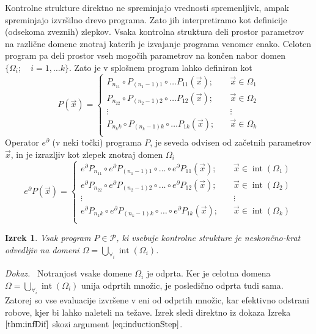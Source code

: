 \documentclass[a4paper, 12pt]{book}
\newcommand{\dP}{\mathcal{P}}
\newcommand{\D}{\partial}
\DeclareMathOperator{\interior}{int}
\newtheorem{izrek}{Izrek}[chapter]
\newenvironment{dokaz}{\emph{Dokaz.}\ }{\hspace{\fill}{$\Box$}}
\begin{document}
Kontrolne strukture direktno ne spreminjajo vrednosti spremenljivk, ampak spreminjajo izvršilno drevo programa. Zato jih interpretiramo kot definicije (odsekoma zveznih) zlepkov. Vsaka kontrolna struktura deli prostor parametrov na različne domene znotraj katerih je izvajanje programa venomer enako. Celoten program pa deli prostor vseh mogočih parametrov na končen nabor domen $\{\Omega_i;\quad i=1,\ldots
  k\}$. Zato je v splošnem program lahko definiran kot
\begin{equation}
   \label{eq:zlrprk_splosno}
   P(\vec{x}) =
   \begin{cases}
     P_{n_11}\circ P_{(n_1-1)1}\circ\ldots P_{11}(\vec{x});&\quad \vec{x}\in\Omega_1\\
     P_{n_22}\circ P_{(n_2-1)2}\circ\ldots P_{12}(\vec{x});&\quad \vec{x}\in\Omega_2\\
     \vdots&\quad\vdots\\
     P_{n_kk}\circ P_{(n_k-1)k}\circ\ldots P_{1k}(\vec{x});&\quad \vec{x}\in\Omega_k\\
   \end{cases}
 \end{equation}
 Operator $e^\D$ (v neki točki) programa $P$, je seveda odvisen od začetnih parametrov $\vec{x}$, in je izrazljiv kot zlepek znotraj domen $\Omega_i$
 \begin{equation}
   \label{eq:Dzlrprk_splosno}
   e^\D P({\vec{x}}) =
   \begin{cases}
     e^\D P_{n_11}\circ e^\D P_{(n_1-1)1}\circ\ldots\circ e^\D P_{11}(\vec{x});&\quad \vec{x}\in\interior(\Omega_1)\\
     e^\D P_{n_22}\circ e^\D P_{(n_2-1)2}\circ\ldots\circ e^\D P_{12}(\vec{x});&\quad \vec{x}\in\interior(\Omega_2)\\
     \vdots&\quad\vdots\\
     e^\D P_{n_kk}\circ e^\D P_{(n_k-1)k}\circ\ldots\circ e^\D P_{1k}(\vec{x});&\quad \vec{x}\in\interior(\Omega_k)\\
   \end{cases}
 \end{equation}

 \begin{izrek}\label{izr:diferentiableOnDomain}
 Vsak program $P\in\dP$, ki vsebuje kontrolne strukture je neskončno-krat odvedljiv na domeni $\Omega=\bigcup\limits_{\forall_i}\interior(\Omega_i)$.
 \end{izrek}
 \begin{dokaz}
  Notranjost vsake domene $\Omega_i$ je odprta. Ker je celotna domena $\Omega=\bigcup\limits_{\forall_i}\interior(\Omega_i)$ unija odprtih množic, je posledično odprta tudi sama. Zatorej so vse evaluacije izvršene v eni od odprtih množic, kar efektivno odstrani robove, kjer bi lahko naleteli na težave. Izrek sledi direktno iz dokaza Izreka $\ref{thm:infDif}$ skozi argument $\eqref{eq:inductionStep}$.
 \end{dokaz}
 
\end{document}
